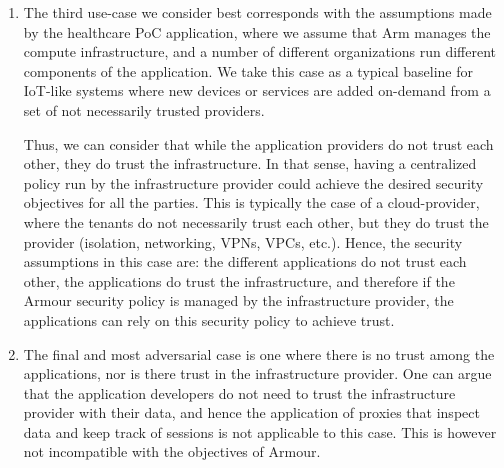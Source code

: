 \documentclass[a4paper]{article}
\newcommand{\armour}{{\sc Armour}}
\begin{document}
\begin{enumerate}
  In this scenario the \armour{} policy would act as a safety-net
  ensuring that the composition of different (perhaps dynamic) actors
  does not violate the high-level security objective.
  
  The trust model for this scenario requires that all applications
  trust the enforcer of the security policy, and the policy acts as a
  security monitor to prevent errors stemming from the composition
  with unknown code.

\item The third use-case we consider best corresponds with the
  assumptions made by the healthcare PoC application, where we assume
  that Arm manages the compute infrastructure, and a number of
  different organizations run different components of the application.
  We take this case as a typical baseline for IoT-like systems where new
  devices or services are added on-demand from a set of
  not necessarily trusted providers.

  Thus, we can consider that while the application providers do not
  trust each other, they do trust the infrastructure.
  In that sense, having a centralized policy run by the infrastructure
  provider could achieve the desired security objectives for all the
  parties.
  This is typically the case of a cloud-provider, where the tenants do
  not necessarily trust each other, but they do trust the provider
  (isolation, networking, VPNs, VPCs, etc.).
  Hence, the security assumptions in this case are: the different
  applications do not trust each other, the applications do trust the
  infrastructure, and therefore if the \armour{} security policy is
  managed by the infrastructure provider, the applications can rely on
  this security policy to achieve trust. 
  
\item The final and most adversarial case is one where there is no trust
  among the applications, nor is there trust in the infrastructure
  provider.
  One can argue that the application developers do not need
  to trust the infrastructure provider with their data, and hence the
  application of proxies that inspect data and keep track of sessions
  is not applicable to this case.
  This is however not incompatible with the objectives of \armour{}. 
  

\end{enumerate}
\end{document}
